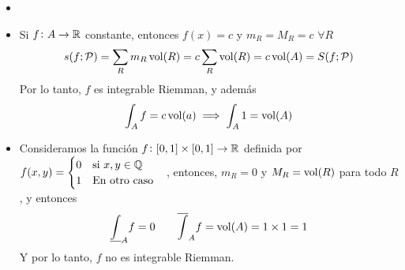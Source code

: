 \begin{example*}
    \begin{itemize}
        \item[]
        \item Si $f \colon A \to \mathbb{R}$ constante, entonces  $f(x) = c$ y
            $m_R = M_R = c$ $\forall R$
            \[
                s(f;\mathcal{P}) = \sum_R m_R \operatorname{vol}(R) = c \sum_R \operatorname{vol}(R)
                = c\operatorname{vol}(A) = S(f;\mathcal{P})
            \]
            Por lo tanto, $f$ es integrable Riemman, y además
            \[
                \int_A f = c\operatorname{vol}(a) \implies \int_A 1 = \operatorname{vol}(A)
            \]
        \item Consideramos la función $f \colon [0,1] \times [0,1] \to \mathbb{R}$
            definida por $f(x,y) = \begin{cases}
                0 \quad \text{si } x,y \in \mathbb{Q} \\
                1 \quad \text{En otro caso}
            \end{cases}$, entonces, $m_R = 0$ y $M_R = \operatorname{vol}(R)$ para todo
            $R$, y entonces
            \[
                \underline{\int}_A f = 0 \qquad
                \overline{\int}_A f = \operatorname{vol}(A) = 1\times1 = 1
            \]
            Y por lo tanto, $f$ no es integrable Riemman.
    \end{itemize}
\end{example*}

